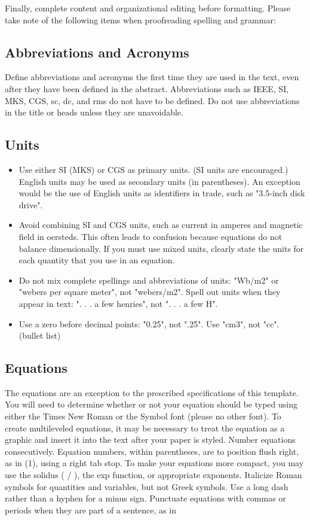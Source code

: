 \documentclass[letterpaper, 10 pt, conference]{ieeeconf}  %
\begin{document}
Finally, complete content and organizational editing before formatting. Please take note of the following items when proofreading spelling and grammar:

\subsection{Abbreviations and Acronyms} Define abbreviations and acronyms the first time they are used in the text, even after they have been defined in the abstract. Abbreviations such as IEEE, SI, MKS, CGS, sc, dc, and rms do not have to be defined. Do not use abbreviations in the title or heads unless they are unavoidable.

\subsection{Units}

\begin{itemize}
\item Use either SI (MKS) or CGS as primary units. (SI units are encouraged.) English units may be used as secondary units (in parentheses). An exception would be the use of English units as identifiers in trade, such as "3.5-inch disk drive".
\item Avoid combining SI and CGS units, such as current in amperes and magnetic field in oersteds. This often leads to confusion because equations do not balance dimensionally. If you must use mixed units, clearly state the units for each quantity that you use in an equation.
\item Do not mix complete spellings and abbreviations of units: "Wb/m2" or "webers per square meter", not "webers/m2".  Spell out units when they appear in text: ". . . a few henries", not ". . . a few H".
\item Use a zero before decimal points: "0.25", not ".25". Use "cm3", not "cc". (bullet list)
\end{itemize}


\subsection{Equations}

The equations are an exception to the prescribed specifications of this template. You will need to determine whether or not your equation should be typed using either the Times New Roman or the Symbol font (please no other font). To create multileveled equations, it may be necessary to treat the equation as a graphic and insert it into the text after your paper is styled. Number equations consecutively. Equation numbers, within parentheses, are to position flush right, as in (1), using a right tab stop. To make your equations more compact, you may use the solidus ( / ), the exp function, or appropriate exponents. Italicize Roman symbols for quantities and variables, but not Greek symbols. Use a long dash rather than a hyphen for a minus sign. Punctuate equations with commas or periods when they are part of a sentence, as in
\end{document}
